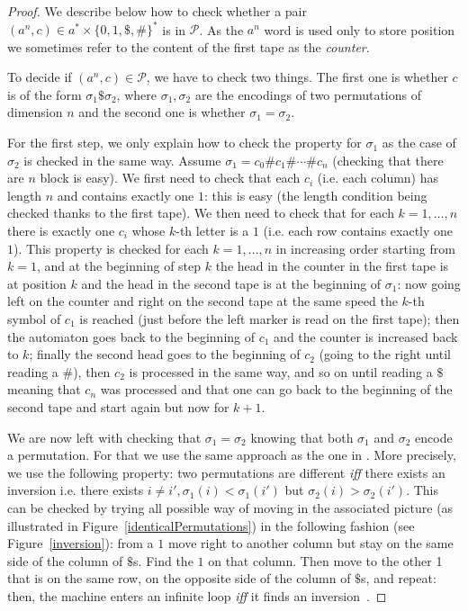 \documentclass[runningheads, envcountsame, a4paper]{llncs}
\newcommand*{\perm}{\mathcal{P}}
\newcommand*{\colsep}{\#}
\newcommand*{\separator}{\$}
\newcommand*{\ie}{i.e.\xspace}
\newcommand*{\ssi}{\emph{iff}\xspace}
\newcommand*{\some}{a}
\newcommand*{\wordsof}[1]{{#1}^*}
\begin{document}
\begin{proof}
  We describe below how to check whether a pair $(\some^n, c) \in
  \wordsof{\some} \times \wordsof{\{0,1,\separator,\colsep\}}$ is in $\perm$. As the
  $\some^n$ word is used only to store position we sometimes refer to
  the content of the first tape as the \emph{counter}.
  
  To decide if $(a^n,c)\in\perm$, we have to check two things. The first
  one is whether $c$ is of the form $\sigma_1 \separator \sigma_2$, where $\sigma_1,
  \sigma_2$ are the encodings of two permutations of dimension $n$ and 
  the second one is whether $\sigma_1 = \sigma_2$.
  
  For the first step, we only explain how to check the property for
  $\sigma_1$ as the case of $\sigma_2$ is checked in the same way. Assume
  $\sigma_1 = c_{0} \colsep c_{1} \colsep \cdots \colsep c_{n}$ (checking
  that there are $n$ block is easy). We first need to check that each $c_i$
  (\ie each column) has length $n$ and contains exactly one $1$: this is
  easy (the length condition being checked thanks to the first tape). We
  then need to check that for each $k=1,\ldots,n$ there is exactly one
  $c_i$ whose $k$-th letter is a $1$ (\ie each row contains exactly one
  $1$). This property is checked for each $k=1,\dots,n$ in increasing
  order starting from $k=1$, and at the beginning of step $k$ the head in
  the counter in the first tape is at position $k$ and the head in the
  second tape is at the beginning of $\sigma_1$: now going left on the
  counter and right on the second tape at the same speed the $k$-th symbol
  of $c_1$ is reached (just before the left marker is read on the first
  tape); then the automaton goes back to the beginning of $c_1$ and the
  counter is increased back to $k$; finally the second head goes to the
  beginning of $c_2$ (going to the right until reading a $\#$), then $c_2$
  is processed in the same way, and so on until reading a $\separator$ meaning
  that $c_n$ was processed and that one can go back to the beginning of the
  second tape and start again but now for $k+1$.
  
  We are now left with checking that $\sigma_1=\sigma_2$ knowing that both
  $\sigma_1$ and $\sigma_2$ encode a permutation. For that we use the same
  approach as the one in \cite[Lemma~2, Condition~(*)]{KariMoore01}. More
  precisely, we use the following property: two permutations are different
  \ssi there exists an inversion \ie there exists $i \neq i', \sigma_1(i) <
  \sigma_1(i')$ but $\sigma_2(i) > \sigma_2(i')$. This can be checked by
  trying all possible way of moving in the associated picture (as
  illustrated in Figure~\ref{identicalPermutations}) in the following
  fashion (see Figure~\ref{inversion}): from a $1$ move right to another
  column but stay on the same side of the column of $\separator$s. Find the $1$ on
  that column. Then move to the other 1 that is on the same row, on the
  opposite side of the column of $\separator$s, and repeat: then, the machine enters
  an infinite loop \ssi it finds an inversion~\cite{KariMoore01}.


\end{proof}
\end{document}
